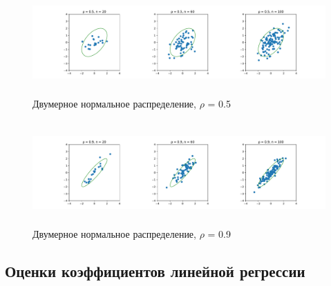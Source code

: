 \documentclass[a4paper]{article}
\begin{document}
             \begin{figure}[H]
                 \centering
                 \includegraphics[width = 16cm, height = 4cm]{src_lab_5/RHO_0.5}
                 \caption{Двумерное нормальное распределение, $\rho$ = 0.5}
                 \label{fig:rho_0_5}
             \end{figure}

             \begin{figure}[H]
                 \centering
                 \includegraphics[width = 16cm, height = 4cm]{src_lab_5/RHO_0.9}
                 \caption{Двумерное нормальное распределение, $\rho$ = 0.9}
                 \label{fig:rho_0_9}
             \end{figure}
    \subsection{Оценки коэффициентов линейной регрессии}
\end{document}
